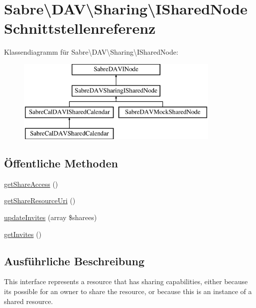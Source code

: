\hypertarget{interface_sabre_1_1_d_a_v_1_1_sharing_1_1_i_shared_node}{}\section{Sabre\textbackslash{}D\+AV\textbackslash{}Sharing\textbackslash{}I\+Shared\+Node Schnittstellenreferenz}
\label{interface_sabre_1_1_d_a_v_1_1_sharing_1_1_i_shared_node}
Klassendiagramm für Sabre\textbackslash{}D\+AV\textbackslash{}Sharing\textbackslash{}I\+Shared\+Node\+:\begin{figure}[H]
\begin{center}
\leavevmode
\includegraphics[height=4.000000cm]{interface_sabre_1_1_d_a_v_1_1_sharing_1_1_i_shared_node}
\end{center}
\end{figure}
\subsection*{Öffentliche Methoden}
\begin{DoxyCompactItemize}
\item 
\mbox{\hyperlink{interface_sabre_1_1_d_a_v_1_1_sharing_1_1_i_shared_node_a1c9b44f6acd1cd63b211bdf987b9d098}{get\+Share\+Access}} ()
\item 
\mbox{\hyperlink{interface_sabre_1_1_d_a_v_1_1_sharing_1_1_i_shared_node_a54b1073bfc389995c722566e18426902}{get\+Share\+Resource\+Uri}} ()
\item 
\mbox{\hyperlink{interface_sabre_1_1_d_a_v_1_1_sharing_1_1_i_shared_node_a76948a1464503ea23d3dd8ff51b561ce}{update\+Invites}} (array \$sharees)
\item 
\mbox{\hyperlink{interface_sabre_1_1_d_a_v_1_1_sharing_1_1_i_shared_node_aa4646ed6e564d50969a4117f0f03eecd}{get\+Invites}} ()
\end{DoxyCompactItemize}


\subsection{Ausführliche Beschreibung}
This interface represents a resource that has sharing capabilities, either because it\textquotesingle{}s possible for an owner to share the resource, or because this is an instance of a shared resource.

